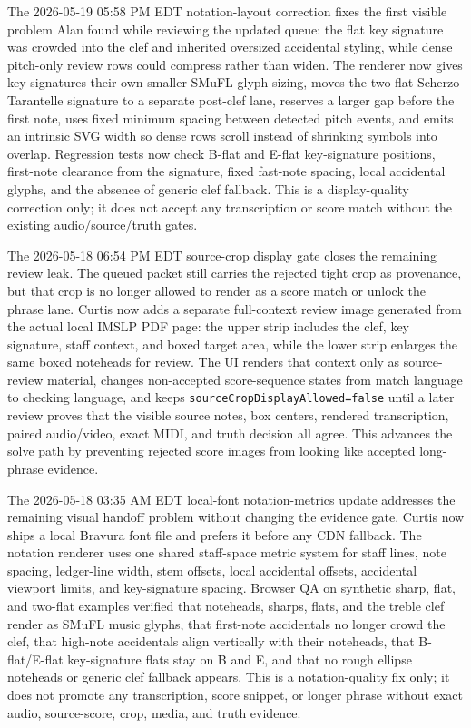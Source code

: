 \documentclass[12pt,letterpaper]{article}
\begin{document}
The 2026-05-19 05:58 PM EDT notation-layout correction fixes the first visible problem Alan found while reviewing the updated queue: the flat key signature was crowded into the clef and inherited oversized accidental styling, while dense pitch-only review rows could compress rather than widen. The renderer now gives key signatures their own smaller SMuFL glyph sizing, moves the two-flat Scherzo-Tarantelle signature to a separate post-clef lane, reserves a larger gap before the first note, uses fixed minimum spacing between detected pitch events, and emits an intrinsic SVG width so dense rows scroll instead of shrinking symbols into overlap. Regression tests now check B-flat and E-flat key-signature positions, first-note clearance from the signature, fixed fast-note spacing, local accidental glyphs, and the absence of generic clef fallback. This is a display-quality correction only; it does not accept any transcription or score match without the existing audio/source/truth gates.

The 2026-05-18 06:54 PM EDT source-crop display gate closes the remaining review leak. The queued packet still carries the rejected tight crop as provenance, but that crop is no longer allowed to render as a score match or unlock the phrase lane. Curtis now adds a separate full-context review image generated from the actual local IMSLP PDF page: the upper strip includes the clef, key signature, staff context, and boxed target area, while the lower strip enlarges the same boxed noteheads for review. The UI renders that context only as source-review material, changes non-accepted score-sequence states from match language to checking language, and keeps \texttt{sourceCropDisplayAllowed=false} until a later review proves that the visible source notes, box centers, rendered transcription, paired audio/video, exact MIDI, and truth decision all agree. This advances the solve path by preventing rejected score images from looking like accepted long-phrase evidence.

The 2026-05-18 03:35 AM EDT local-font notation-metrics update addresses the remaining visual handoff problem without changing the evidence gate. Curtis now ships a local Bravura font file and prefers it before any CDN fallback. The notation renderer uses one shared staff-space metric system for staff lines, note spacing, ledger-line width, stem offsets, local accidental offsets, accidental viewport limits, and key-signature spacing. Browser QA on synthetic sharp, flat, and two-flat examples verified that noteheads, sharps, flats, and the treble clef render as SMuFL music glyphs, that first-note accidentals no longer crowd the clef, that high-note accidentals align vertically with their noteheads, that B-flat/E-flat key-signature flats stay on B and E, and that no rough ellipse noteheads or generic clef fallback appears. This is a notation-quality fix only; it does not promote any transcription, score snippet, or longer phrase without exact audio, source-score, crop, media, and truth evidence.
\end{document}
